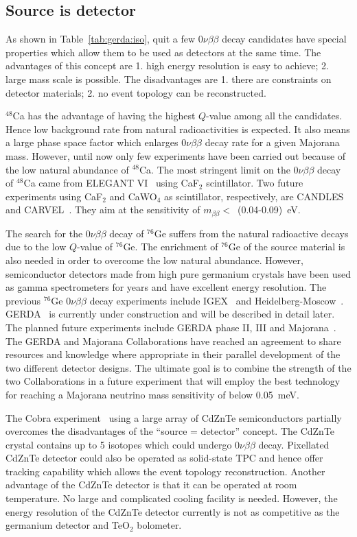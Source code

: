 \subsection{Source is detector}
\label{sec:gerda:sed}
As shown in Table~\ref{tab:gerda:iso}, quit a few $0\nu\beta\beta$ decay candidates have special properties which allow them to be used as detectors at the same time. The advantages of this concept are 1. high energy resolution is easy to achieve; 2. large mass scale is possible. The disadvantages are 1. there are constraints on detector materials; 2. no event topology can be reconstructed.

$^{48}$Ca has the advantage of having the highest $Q$-value among all the candidates. Hence low background rate from natural radioactivities is expected. It also means a large phase space factor which enlarges $0\nu\beta\beta$ decay rate for a given Majorana mass. However, until now only few experiments have been carried out because of the low natural abundance of $^{48}$Ca. The most stringent limit on the $0\nu\beta\beta$ decay of $^{48}$Ca came from ELEGANT VI~\cite{Oga04} using CaF$_{2}$ scintillator. Two future experiments using CaF$_{2}$ and CaWO$_{4}$ as scintillator, respectively, are CANDLES~\cite{Ume06} and CARVEL~\cite{Zde05}. They aim at the sensitivity of $m_{\beta\beta} <$~(0.04-0.09)~eV.

The search for the $0\nu\beta\beta$ decay of $^{76}$Ge suffers from the natural radioactive decays due to the low $Q$-value of $^{76}$Ge. The enrichment of $^{76}$Ge of the source material is also needed in order to overcome the low natural abundance. However, semiconductor detectors made from high pure germanium crystals have been used as gamma spectrometers for years and have excellent energy resolution. The previous $^{76}$Ge $0\nu\beta\beta$ decay experiments include IGEX~\cite{Aal02} and Heidelberg-Moscow~\cite{Hei04}. GERDA~\cite{Sch05} is currently under construction and will be described in detail later. The planned future experiments include GERDA phase II, III and Majorana~\cite{Gai03, Aal04}. The GERDA and Majorana Collaborations have reached an agreement to share resources and knowledge where appropriate in their parallel development of the two different detector designs. The ultimate goal is to combine the strength of the two Collaborations in a future experiment that will employ the best technology for reaching a Majorana neutrino mass sensitivity of below 0.05~meV.

The Cobra experiment~\cite{Zub01, Ell02, Kie03} using a large array of CdZnTe semiconductors partially overcomes the disadvantages of the ``source = detector'' concept. The CdZnTe crystal contains up to 5 isotopes which could undergo $0\nu\beta\beta$ decay. Pixellated CdZnTe detector could also be operated as solid-state TPC and hence offer tracking capability which allows the event topology reconstruction. Another advantage of the CdZnTe detector is that it can be operated at room temperature. No large and complicated cooling facility is needed. However, the energy resolution of the CdZnTe detector currently is not as competitive as the germanium detector and TeO$_{2}$ bolometer.

